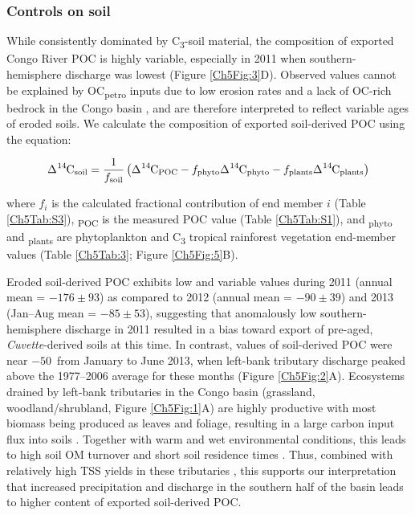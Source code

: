 \subsubsection{Controls on soil }

While consistently dominated by C\textsubscript{3}-soil material, the  composition of exported Congo River POC is highly variable, especially in 2011 when southern-hemisphere discharge was lowest (Figure \ref{Ch5Fig:3}D). Observed  values cannot be explained by OC\textsubscript{petro} inputs due to low erosion rates and a lack of OC-rich bedrock in the Congo basin \citep{Copard:2007bf}, and are therefore interpreted to reflect variable ages of eroded soils. We calculate the  composition of exported soil-derived POC using the equation:

\begin{equation}\label{Ch5Eq:4}
	\ce{\Delta^{14}C}_{\text{soil}} = \frac{1}{f_{\text{soil}}} \left(\ce{\Delta^{14}C}_{\text{POC}} - f_{\text{phyto}}\ce{\Delta^{14}C}_{\text{phyto}} - f_{\text{plants}}\ce{\Delta^{14}C}_{\text{plants}} \right)
\end{equation}

where $f_i$ is the calculated fractional contribution of end member $i$ (Table \ref{Ch5Tab:S3}), \textsubscript{POC} is the measured POC  value (Table \ref{Ch5Tab:S1}), and \textsubscript{phyto} and \textsubscript{plants} are phytoplankton and C\textsubscript{3} tropical rainforest vegetation end-member values (Table \ref{Ch5Tab:3}; Figure \ref{Ch5Fig:5}B). 

Eroded soil-derived POC exhibits low and variable  values during 2011 (annual mean = $-176 \pm 93$\textperthousand) as compared to 2012 (annual mean = $-90 \pm 39$\textperthousand) and 2013 (Jan--Aug mean = $-85 \pm 53$\textperthousand), suggesting that anomalously low southern-hemisphere discharge in 2011 resulted in a bias toward export of pre-aged, \textit{Cuvette}-derived soils at this time. In contrast,  values of soil-derived POC were near $-50$\textperthousand\ from January to June 2013, when left-bank tributary discharge peaked above the 1977--2006 average for these months (Figure \ref{Ch5Fig:2}A). Ecosystems drained by left-bank tributaries in the Congo basin (grassland, woodland/shrubland, Figure \ref{Ch5Fig:1}A) are highly productive with most biomass being produced as leaves and foliage, resulting in a large carbon input flux into soils \citep{Bloom:2016gm}. Together with warm and wet environmental conditions, this leads to high soil OM turnover and short soil residence times \citep{Carvalhais:2014dc}. Thus, combined with relatively high TSS yields in these tributaries \citep{Laraque:2009fz}, this supports our interpretation that increased precipitation and discharge in the southern half of the basin leads to higher  content of exported soil-derived POC.

